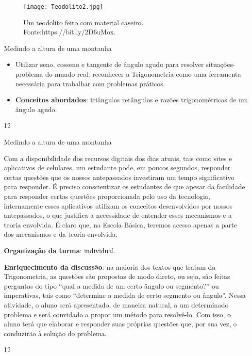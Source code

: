 \begin{figure}[H]
\centering
\texttt{[image: Teodolito2.jpg]}
\caption{Um teodolito feito com material caseiro. Fonte:https://bit.ly/2D6uMox.}
\label{Teodolito2}
\end{figure}
\clearpage
\def\currentcolor{session2}
\begin{objectives}{Medindo a altura de uma montanha}
{
\begin{itemize}
\item Utilizar seno, cosseno e tangente de ângulo agudo para resolver situações-problema do mundo real; reconhecer a Trigonometria como uma ferramenta necessária para trabalhar com problemas práticos.

\item \textbf{Conceitos abordados}: triângulos retângulos e razões trigonométricas de um ângulo agudo.
\end{itemize}
}{1}{2}
\end{objectives}
\begin{sugestions}{Medindo a altura de uma montanha}
{
Com a disponibilidade dos recursos digitais dos dias atuais, tais como sites e aplicativos de celulares, um estudante pode, em poucos segundos, responder certas questões que os nossos antepassados investiram um tempo significativo para responder. É preciso conscientizar os estudantes de que apesar da facilidade para responder certas questões proporcionada pelo uso da tecnologia, internamente esses aplicativos utilizam os conceitos desenvolvidos por nossos antepassados, o que justifica a necessidade de entender esses mecanismos e a teoria envolvida. É claro que, na Escola Básica, teremos acesso apenas a parte dos mecanismos e da teoria envolvida.

\textbf{Organização da turma}: individual.

\textbf{Enriquecimento da discussão}: na maioria dos textos que tratam da Trigonometria, as questões são propostas de modo direto, ou seja, são feitas perguntas do tipo ``qual a medida de um certo ângulo ou segmento?'' ou imperativas, tais como ``determine a medida de certo segmento ou ângulo''. Nessa atividade, o aluno será apresentado, de maneira natural, a um determinado problema e será convidado a propor um método para resolvê-lo. Com isso, o aluno terá que elaborar e responder suas próprias questões que, por sua vez, o conduzirão à solução do problema.
}{1}{2}
\end{sugestions}
